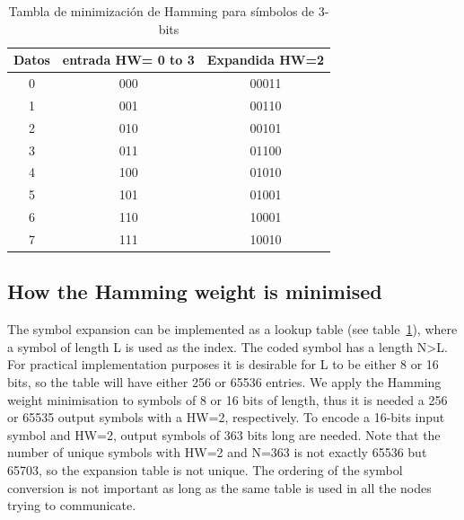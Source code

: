 \documentclass[a4paper,10pt]{report}
\begin{document}
\begin{table}[t]
\begin{center}
\begin{tabular}{c c c}
Datos & entrada HW= 0 to 3 & Expandida HW=2\\
\hline\hline
0 & 000 & 00011\\
1 & 001 & 00110\\
2 & 010 & 00101\\
3 & 011 & 01100\\
4 & 100 & 01010\\
5 & 101 & 01001\\
6 & 110 & 10001\\
7 & 111 & 10010\\
\end{tabular}
\caption{Tambla de minimización de Hamming para símbolos de 3-bits}
\label{hwtable}
\end{center}
 \end{table}
 
\subsection{How the Hamming weight is minimised}
The symbol expansion can be implemented as a lookup table (see table~\ref{hwtable}), where a symbol of length L is used as the index.
The coded symbol has a length N\textgreater L.
For practical implementation purposes it is desirable for L to be either 8 or 16 bits, so the table will have either 256 or 65536 entries.
We apply the Hamming weight minimisation to symbols of 8 or 16 bits of length, thus it is needed a 256 or 65535 output symbols with a HW=2, respectively.
To encode a 16-bits input symbol and HW=2, output symbols of 363 bits long are needed.
Note that the number of unique symbols with HW=2 and N=363 is not exactly 65536 but 65703, so the expansion table is not unique.
The ordering of the symbol conversion is not important as long as the same table is used in all the nodes trying to communicate.
\end{document}
